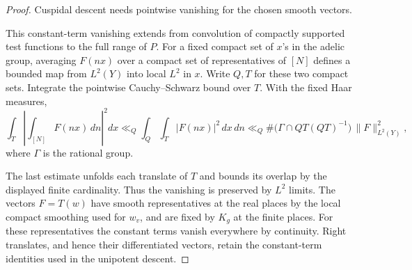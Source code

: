 \begin{proof}

Cuspidal descent needs pointwise vanishing for the chosen smooth vectors.


This constant-term vanishing extends from convolution of
compactly supported test functions to the full range of \(P\).
For a fixed compact set of \(x\)'s in the adelic group,
averaging \(F(nx)\) over a compact set of representatives of
\([N]\) defines a bounded map from \(L^2(Y)\) into local
\(L^2\) in \(x\). Write \(Q,T\) for these two compact sets. Integrate the pointwise
Cauchy--Schwarz bound over \(T\). With the fixed Haar measures,
\[
 \int_T\left|\int_{[N]}F(nx)\,dn\right|^2 dx
 \ll_Q \int_Q\int_T |F(nx)|^2\,dx\,dn
 \ll_Q \#\bigl(\Gamma\cap QT(QT)^{-1}\bigr)\,\|F\|_{L^2(Y)}^2 ,
\]
where \(\Gamma\) is the rational group.

The last estimate unfolds
each translate of \(T\) and bounds its overlap by the displayed
finite cardinality. Thus the vanishing is preserved by \(L^2\)
limits. The vectors \(F=T(w)\) have smooth representatives at
the real places by the local compact smoothing used for \(w_v\),
and are fixed by \(K_g\) at the finite places. For these
representatives the constant terms vanish everywhere by
continuity. Right translates, and hence their differentiated
vectors, retain the constant-term identities used in the
unipotent descent.
\end{proof}
